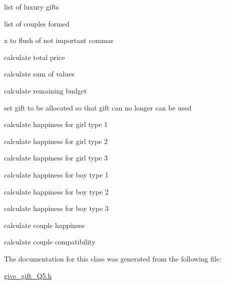 list of luxury gifts

list of couples formed

x to flush of not important commas

calculate total price

calculate sum of values

calculate remaining budget

set gift to be allocated so that gift can no longer can be used

calculate happiness for girl type 1

calculate happiness for girl type 2

calculate happiness for girl type 3

calculate happiness for boy type 1

calculate happiness for boy type 2

calculate happiness for boy type 3

calculate couple happiness

calculate couple compatibility 

The documentation for this class was generated from the following file\+:\begin{DoxyCompactItemize}
\item 
\hyperlink{give__gift___q5_8h}{give\+\_\+gift\+\_\+\+Q5.\+h}\end{DoxyCompactItemize}
